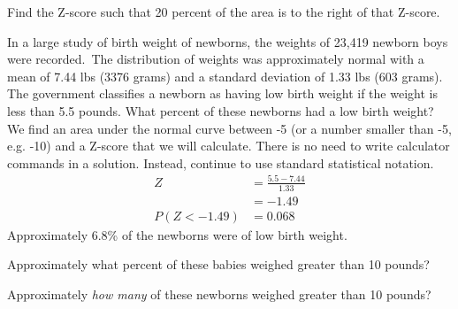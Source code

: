 \begin{exercisewrap}
\begin{nexercise}Find the Z-score such that 20 percent of the area is to the right of that Z-score.\footnotemark\end{nexercise}
\end{exercisewrap}	

\D{\newpage}

\begin{examplewrap}
\begin{nexample}{In a large study of birth weight of newborns, the weights of 23,419 newborn boys were recorded.\footnotemark\, The distribution of weights was approximately normal with a mean of 7.44 lbs (3376 grams) and a standard deviation of 1.33 lbs (603 grams). The government classifies a newborn as having low birth weight if the weight is less than 5.5 pounds. What percent of these newborns had a low birth weight?}
We find an area under the normal curve between -5 (or a number smaller than -5, e.g. -10) and a Z-score that we will calculate. There is no need to write calculator commands in a solution. Instead, continue to use standard statistical notation. 
\begin{align*}
Z&=\frac{5.5-7.44}{1.33}\\
&=-1.49\\
P(Z < -1.49) &= 0.068
\end{align*}
Approximately 6.8\% of the newborns were of low birth weight.
\end{nexample}
\end{examplewrap}

\begin{exercisewrap}
\begin{nexercise}Approximately what percent of these babies weighed greater than 10 pounds?\footnotemark\end{nexercise}
\end{exercisewrap}


\begin{exercisewrap}
\begin{nexercise}Approximately \emph{how many} of these newborns weighed greater than 10 pounds?\footnotemark
\end{nexercise}
\end{exercisewrap}

